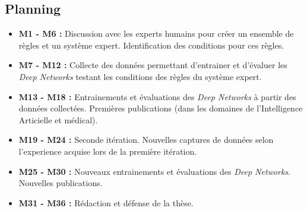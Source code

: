 \documentclass[french]{article}
\begin{document}
\subsection{Planning}
\label{sec:org2dc06f3}
\begin{itemize}
\item \textbf{M1 - M6 :} Discussion avec les experts humains pour créer un ensemble de règles et un système expert. Identification des conditions pour ces règles.
\item \textbf{M7 - M12 :} Collecte des données permettant d’entrainer et d’évaluer les \emph{Deep Networks} testant les conditions des règles du système expert.
\item \textbf{M13 - M18 :} Entrainements et évaluations des \emph{Deep Networks} à partir des données col\-lectées. Premières publications (dans les domaines de l’Intelligence Articielle et médical).
\item \textbf{M19 - M24 :} Seconde itération. Nouvelles captures de données selon l’experience acquise lors de la première itération.
\item \textbf{M25 - M30 :} Nouveaux entrainements et évaluations des \emph{Deep Networks}. Nouvelles pub\-lications.
\item \textbf{M31 - M36 :} Rédaction et défense de la thèse.
\end{itemize}




\end{document}
